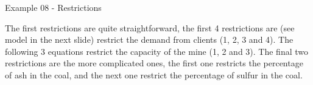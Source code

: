 \begin{frame}{Example 08 - Restrictions}

The first restrictions are quite straightforward, the first 4 restrictions are
(see model in the next slide) restrict the demand from clients (1, 2, 3 and 4).
The following 3 equations restrict the capacity of the mine (1, 2 and 3). The
final two restrictions are the more complicated ones, the first one restricts
the percentage of ash in the coal, and the next one restrict the percentage of
sulfur in the coal.

\end{frame}

